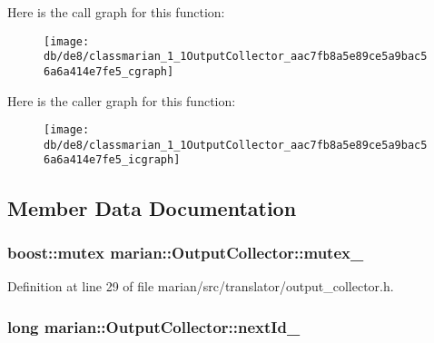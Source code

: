 Here is the call graph for this function\+:
\nopagebreak
\begin{figure}[H]
\begin{center}
\leavevmode
\texttt{[image: db/de8/classmarian\_1\_1OutputCollector\_aac7fb8a5e89ce5a9bac56a6a414e7fe5\_cgraph]}
\end{center}
\end{figure}




Here is the caller graph for this function\+:
\nopagebreak
\begin{figure}[H]
\begin{center}
\leavevmode
\texttt{[image: db/de8/classmarian\_1\_1OutputCollector\_aac7fb8a5e89ce5a9bac56a6a414e7fe5\_icgraph]}
\end{center}
\end{figure}




\subsection{Member Data Documentation}
\subsubsection[{\texorpdfstring{mutex\+\_\+}{mutex_}}]{\setlength{\rightskip}{0pt plus 5cm}boost\+::mutex marian\+::\+Output\+Collector\+::mutex\+\_\+\hspace{0.3cm}{\ttfamily [protected]}}\hypertarget{classmarian_1_1OutputCollector_acded8bfaafbb69d10e32a4b38263e08b}{}\label{classmarian_1_1OutputCollector_acded8bfaafbb69d10e32a4b38263e08b}


Definition at line 29 of file marian/src/translator/output\+\_\+collector.\+h.

\subsubsection[{\texorpdfstring{next\+Id\+\_\+}{nextId_}}]{\setlength{\rightskip}{0pt plus 5cm}long marian\+::\+Output\+Collector\+::next\+Id\+\_\+\hspace{0.3cm}{\ttfamily [protected]}}\hypertarget{classmarian_1_1OutputCollector_a0d936e88142afee4f490f6f39a66b792}{}\label{classmarian_1_1OutputCollector_a0d936e88142afee4f490f6f39a66b792}


